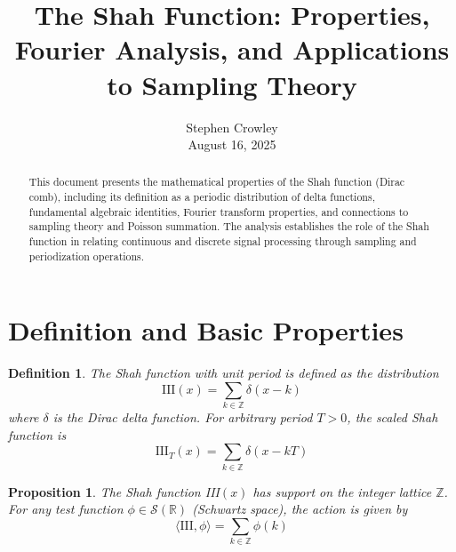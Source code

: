 \documentclass{article}
\newcommand{\tmaffiliation}[1]{\\ #1}
\newtheorem{definition}{Definition}
\newtheorem{proposition}{Proposition}
\begin{document}
\title{The Shah Function: Properties, Fourier Analysis, and Applications to
Sampling Theory}

\author{
  Stephen Crowley
  \tmaffiliation{August 16, 2025}
}

\maketitle

\begin{abstract}
  This document presents the mathematical properties of the Shah function
  (Dirac comb), including its definition as a periodic distribution of delta
  functions, fundamental algebraic identities, Fourier transform properties,
  and connections to sampling theory and Poisson summation. The analysis
  establishes the role of the Shah function in relating continuous and
  discrete signal processing through sampling and periodization operations.
\end{abstract}

{\tableofcontents}

\section{Definition and Basic Properties}

\begin{definition}
  \label{def:shah_function}The Shah function with unit period is defined as
  the distribution
  \begin{equation}
    \label{eq:shah_unit} \text{III} (x) = \sum_{k \in \mathbb{Z}} \delta (x -
    k)
  \end{equation}
  where $\delta$ is the Dirac delta function. For arbitrary period $T > 0$,
  the scaled Shah function is
  \begin{equation}
    \label{eq:shah_period_T} \text{III}_T (x) = \sum_{k \in \mathbb{Z}} \delta
    (x - kT)
  \end{equation}
\end{definition}

\begin{proposition}
  \label{prop:shah_support}The Shah function III$(x)$ has support on the
  integer lattice $\mathbb{Z}$. For any test function $\phi \in \mathcal{S}
  (\mathbb{R})$ (Schwartz space), the action is given by
  \begin{equation}
    \label{eq:shah_action} \langle \text{III}, \phi \rangle = \sum_{k \in
    \mathbb{Z}} \phi (k)
  \end{equation}
\end{proposition}
\end{document}

